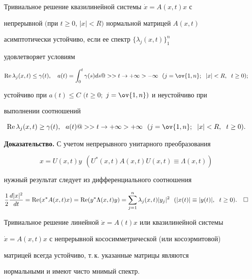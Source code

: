 \begin{thm}


Тривиальное решение квазилинейной системы $\Dot x=A(x,t)x$ с 


непрерывной $($при $t\ge0$, $|x|<R)$ нормальной матрицей $A(x,t)$ 


асимптотически устойчиво, если ее спектр $\{\lambda_j(x,t)\}^n_1$ 


удовлетворяет условиям


$$


\re\lambda_j(x,t)\le\gamma(t),\quad


a(t)=\int^t_0 \gamma(s)ds @>>{t\to+\infty}>-\infty


\ \ (j=\ov{1,n};\ \; |x|<R,\ \; t\ge0);


$$


устойчиво при $a(t)\le C$ $(t\ge0;$ $j=\ov{1,n})$ и неустойчиво при 


выполнении соотношений


$$


\re\lambda_j(x,t)\ge\gamma(t),\ \


a(t)@>>{t\to+\infty}>+\infty\ \ (j=\ov{1,n};


\ \; |x|<R, \ \; t\ge0).


$$


\end{thm}





{\bf Доказательство.} С учетом непрерывного унитарного преобразования


$$


x=U(x,t)y \ \ (U^*(x,t)A(x,t)U(x,t)\equiv\Lambda(x,t))


$$


нужный результат следует из дифференциального соотношения


$$


\frac{1}{2}\frac{d|x|^2}{d t}=\re(x^*A(x,t)x)=


\re(y^*\Lambda(x,t)y)=


\sum^n_{j=1} \lambda_j(x,t)|y_j|^2\ \ (|x(t)|\equiv


|y(t)|,\ \; t\ge0).\quad\square


$$





\begin{cor}


Тривиальное решение линейной $\Dot x=A(t)x$ или квазилинейной системы 


$\Dot x=A(x,t)x$ с непрерывной кососимметрической (или косоэрмитовой) 


матрицей всегда устойчиво, т.\,к. указанные матрицы являются 


нормальными и имеют чисто мнимый спектр.


\end{cor}





